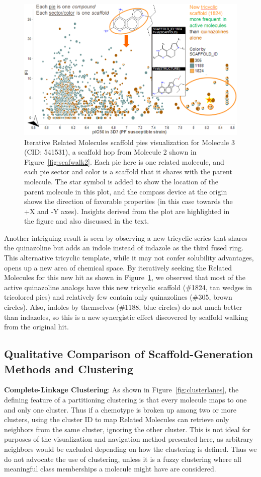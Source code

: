 \documentclass[journal=jacsat,manuscript=article]{achemso}
\newcommand*\fref[1]{Figure~\ref{fig:#1}}
\begin{document}
\begin{figure}
\includegraphics[width=5.5in]{fig/mol3_RGtool_scafpie_iter.png}
\caption{Iterative Related Molecules scaffold pies visualization for Molecule 3 (CID: 541531), a scaffold hop from Molecule 2 shown in \fref{scafwalk2}. Each pie here is one related molecule, and each pie sector and color is a scaffold that it shares with the parent molecule. The star symbol is added to show the location of the parent molecule in this plot, and the compass device at the origin shows the direction of favorable properties (in this case towards the +X and -Y axes). Insights derived from the plot are highlighted in the figure and also discussed in the text.}
\label{fig:scafwalk3}
\end{figure}

Another intriguing result is seen by observing a new tricyclic series that shares the quinazoline but adds an indole instead of indazole as the third fused ring. This alternative tricyclic template, while it may not confer solubility advantages, opens up a new area of chemical space. By iteratively seeking the Related Molecules for this new hit as shown in \fref{scafwalk3}, we observed that most of the active quinazoline analogs have this new tricyclic scaffold (\#1824, tan wedges in tricolored pies) and relatively few contain only quinazolines (\#305, brown circles). Also, indoles by themselves (\#1188, blue circles) do not much better than indazoles, so this is a new synergistic effect discovered by scaffold walking from the original hit.            


\subsection{Qualitative Comparison of Scaffold-Generation Methods and Clustering}
{\bf Complete-Linkage Clustering}: As shown in \fref{clusterlanes}, the defining feature of a partitioning clustering is that every molecule maps to one and only one cluster. Thus if a chemotype is broken up among two or more clusters, using the cluster ID to map Related Molecules can retrieve only neighbors from the same cluster, ignoring the other cluster. This is not ideal for purposes of the visualization and navigation method presented here, as arbitrary neighbors would be excluded depending on how the clustering is defined.  Thus we do not advocate the use of clustering, unless it is a fuzzy clustering where all meaningful class memberships a molecule might have are considered. 
\end{document}
